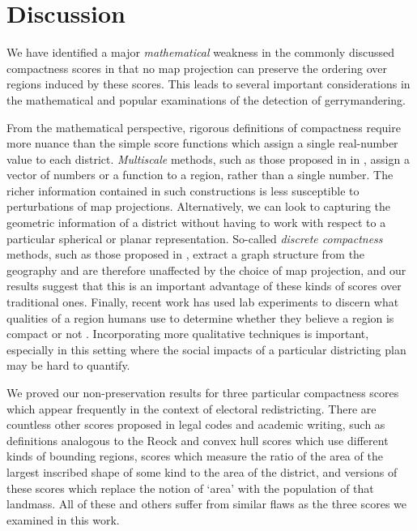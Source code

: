 \section{Discussion}



We have identified a major \textit{mathematical} weakness in the commonly discussed compactness scores in that no map projection can preserve the ordering over regions induced by these scores.  This leads to several important considerations in the mathematical and popular examinations of the detection of gerrymandering.

From the mathematical perspective, rigorous definitions of compactness require more nuance than the simple score functions which assign a single real-number value to each district.  \textit{Multiscale} methods, such as those proposed in in \cite{deford2018tv}, assign a vector of numbers or a function to a region, rather than a single number.  The richer information contained in such constructions is less susceptible to perturbations of map projections.
Alternatively, we can look to capturing the geometric information of a district without having to work with respect to a particular spherical or planar representation.  So-called \textit{discrete compactness} methods, such as those proposed in \cite{duchin2018discrete}, extract a graph structure from the geography and are therefore unaffected by the choice of map projection, and our results suggest that this is an important advantage of these kinds of scores over traditional ones.  Finally, recent work has used lab experiments to discern what qualities of a region humans use to determine whether they believe a region is compact or not \cite{kingeyeball}.  Incorporating more qualitative techniques is important, especially in this setting where the social impacts of a particular districting plan may be hard to quantify.


We proved our non-preservation results for three particular compactness scores which appear frequently in the context of electoral redistricting.  There are countless other scores proposed in legal codes and academic writing, such as definitions analogous to the Reock and convex hull scores which use different kinds of bounding regions, scores which measure the ratio of the area of the largest inscribed shape of some kind to the area of the district, and versions of these scores which replace the notion of `area' with the population of that landmass.  All of these and others suffer from similar flaws as the three scores we examined in this work.


